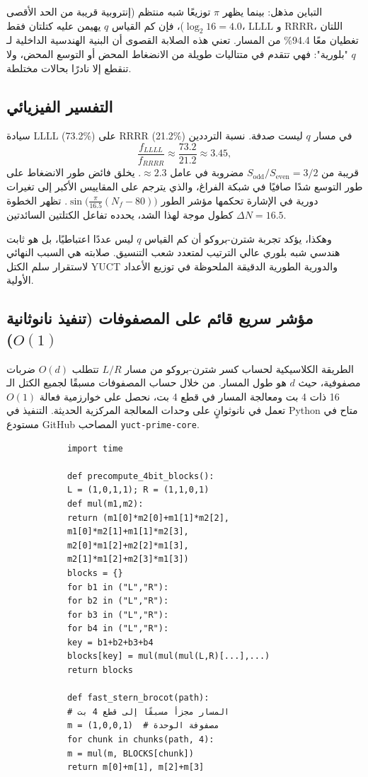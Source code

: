 \documentclass[11pt,a4paper]{article}
\begin{document}
	التباين مذهل: بينما يظهر \(\pi\) توزيعًا شبه منتظم (إنتروبية قريبة من الحد الأقصى \(\log_2 16 = 4.0\))، فإن كم القياس \(q\) يهيمن عليه كتلتان فقط، LLLL و RRRR، اللتان تغطيان معًا 94.4\% من المسار. تعني هذه الصلابة القصوى أن البنية الهندسية الداخلية لـ \(q\) "بلورية": فهي تتقدم في متتاليات طويلة من الانضغاط المحض أو التوسع المحض، ولا تنقطع إلا نادرًا بحالات مختلطة.
	
	\subsection{التفسير الفيزيائي}
	
	سيادة LLLL (73.2\%) على RRRR (21.2\%) في مسار \(q\) ليست صدفة. نسبة الترددين
	\[
	\frac{f_{LLLL}}{f_{RRRR}} \approx \frac{73.2}{21.2} \approx 3.45,
	\]
	قريبة من \(S_{\mathrm{odd}}/S_{\mathrm{even}} = 3/2\) مضروبة في عامل \(\approx 2.3\). يخلق فائض طور الانضغاط على طور التوسع شدًا صافيًا في شبكة الفراغ، والذي يترجم على المقاييس الأكبر إلى تغيرات دورية في الإشارة تحكمها مؤشر الطور \(\sin\!\bigl(\frac{\pi}{16.5}(N_f-80)\bigr)\). تظهر الخطوة \(\Delta N = 16.5\) كطول موجة لهذا الشد، يحدده تفاعل الكتلتين السائدتين.
	
	وهكذا، يؤكد تجربة شترن-بروكو أن كم القياس \(q\) ليس عددًا اعتباطيًا، بل هو ثابت هندسي شبه بلوري عالي الترتيب لمتعدد شعب التنسيق. صلابته هي السبب النهائي لاستقرار سلم الكتل YUCT والدورية الطورية الدقيقة الملحوظة في توزيع الأعداد الأولية.
	
	\subsection{مؤشر سريع قائم على المصفوفات (تنفيذ نانوثانية \(O(1)\))}
	
	الطريقة الكلاسيكية لحساب كسر شترن-بروكو من مسار \(L/R\) تتطلب \(O(d)\) ضربات مصفوفية، حيث \(d\) هو طول المسار. من خلال حساب المصفوفات مسبقًا لجميع الكتل الـ 16 ذات 4 بت ومعالجة المسار في قطع 4 بت، نحصل على خوارزمية فعالة \(O(1)\) تعمل في نانوثوانٍ على وحدات المعالجة المركزية الحديثة. التنفيذ في Python متاح في مستودع GitHub المصاحب \texttt{yuct-prime-core}.
	
	\begin{tcolorbox}[title=مؤشر الكتل ذو 4 بت (Python), breakable]
		\begin{lstlisting}
			import time
			
			def precompute_4bit_blocks():
			L = (1,0,1,1); R = (1,1,0,1)
			def mul(m1,m2):
			return (m1[0]*m2[0]+m1[1]*m2[2],
			m1[0]*m2[1]+m1[1]*m2[3],
			m2[0]*m1[2]+m2[2]*m1[3],
			m2[1]*m1[2]+m2[3]*m1[3])
			blocks = {}
			for b1 in ("L","R"):
			for b2 in ("L","R"):
			for b3 in ("L","R"):
			for b4 in ("L","R"):
			key = b1+b2+b3+b4
			blocks[key] = mul(mul(mul(L,R)[...],...)
			return blocks
			
			def fast_stern_brocot(path):
			# المسار مجزأ مسبقًا إلى قطع 4 بت
			m = (1,0,0,1)  # مصفوفة الوحدة
			for chunk in chunks(path, 4):
			m = mul(m, BLOCKS[chunk])
			return m[0]+m[1], m[2]+m[3]
		\end{lstlisting}
	\end{tcolorbox}
	
\end{document}
